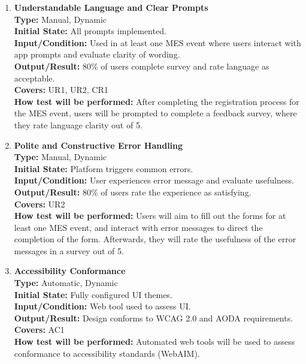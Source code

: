 \documentclass[12pt, titlepage]{article}
\begin{document}
\begin{enumerate}[label=\bfseries UH-\arabic*:, wide=0pt]
  \item \label{test-UH4} \textbf{Understandable Language and Clear Prompts}\\[2mm]
    {\bf Type:} Manual, Dynamic\\
    {\bf Initial State:} All prompts implemented.\\
    {\bf Input/Condition:} Used in at least one MES event where users interact with app prompts and evaluate clarity of wording.\\
    {\bf Output/Result:} 80\% of users complete survey and rate language as acceptable.\\
    {\bf Covers:} UR1, UR2, CR1\\
    {\bf How test will be performed:} After completing the registration process for the MES event, users will be prompted to complete a feedback survey, where they rate language clarity out of 5.

  \item \label{test-UH5} \textbf{Polite and Constructive Error Handling}\\[2mm]
    {\bf Type:} Manual, Dynamic\\
    {\bf Initial State:} Platform triggers common errors.\\
    {\bf Input/Condition:} User experiences error message and evaluate usefulness.\\
    {\bf Output/Result:} 80\% of users rate the experience as satisfying.\\
    {\bf Covers:} UR2\\
    {\bf How test will be performed:} Users will aim to fill out the forms for at least one MES event, and interact with error messages to direct the completion of the form. Afterwards, they will rate the usefulness of the error messages in a survey out of 5.

  \item \label{test-UH6} \textbf{Accessibility Conformance}\\[2mm]
    {\bf Type:} Automatic, Dynamic\\
    {\bf Initial State:} Fully configured UI themes.\\
    {\bf Input/Condition:} Web tool used to assess UI.\\
    {\bf Output/Result:} Design conforms to WCAG 2.0 and AODA requirements.\\
    {\bf Covers:} AC1\\
    {\bf How test will be performed:} Automated web tools will be used to assess conformance to accessibility standards (WebAIM).
\end{enumerate}
\end{document}
